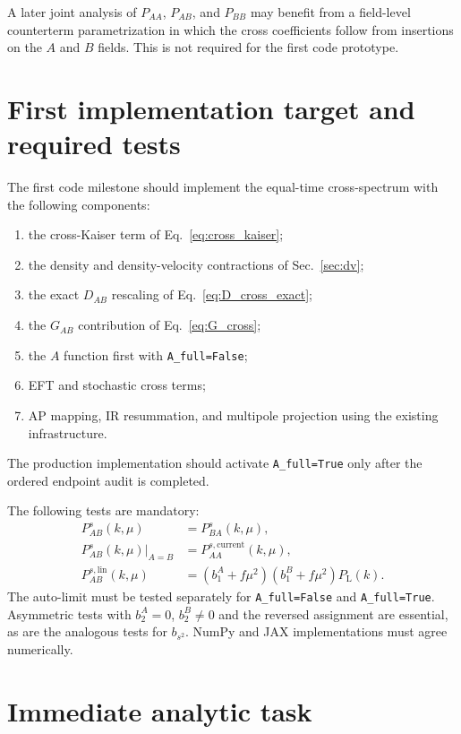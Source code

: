 \documentclass[11pt,a4paper]{article}
\newcommand{\PL}{P_{\mathrm{L}}}
\begin{document}
A later joint analysis of $P_{AA}$, $P_{AB}$, and $P_{BB}$ may benefit from a field-level counterterm parametrization in which the cross coefficients follow from insertions on the $A$ and $B$ fields. This is not required for the first code prototype.

\section{First implementation target and required tests}
\label{sec:implementation}

The first code milestone should implement the equal-time cross-spectrum with the following components:
\begin{enumerate}[leftmargin=1.7em]
    \item the cross-Kaiser term of Eq.~\eqref{eq:cross_kaiser};
    \item the density and density-velocity contractions of Sec.~\ref{sec:dv};
    \item the exact $D_{AB}$ rescaling of Eq.~\eqref{eq:D_cross_exact};
    \item the $G_{AB}$ contribution of Eq.~\eqref{eq:G_cross};
    \item the $A$ function first with \texttt{A\_full=False};
    \item EFT and stochastic cross terms;
    \item AP mapping, IR resummation, and multipole projection using the existing infrastructure.
\end{enumerate}
The production implementation should activate \texttt{A\_full=True} only after the ordered endpoint audit is completed.

The following tests are mandatory:
\begin{align}
    P_{AB}^s(k,\mu)&=P_{BA}^s(k,\mu),
    \\
    P_{AB}^s(k,\mu)\big|_{A=B}&=P_{AA}^{s,\mathrm{current}}(k,\mu),
    \\
    P_{AB}^{s,\mathrm{lin}}(k,\mu)
    &=
    \left(b_1^A+f\mu^2\right)
    \left(b_1^B+f\mu^2\right)\PL(k).
\end{align}
The auto-limit must be tested separately for \texttt{A\_full=False} and \texttt{A\_full=True}. Asymmetric tests with $b_2^A=0$, $b_2^B\neq0$ and the reversed assignment are essential, as are the analogous tests for $b_{s^2}$. NumPy and JAX implementations must agree numerically.

\section{Immediate analytic task}
\label{sec:next}
\end{document}
